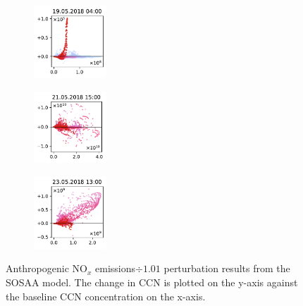\begin{figure}[H]
    \begin{subfigure}
        \centering
        \includegraphics[width=0.30\textwidth,valign=t]{evaluation/figures/perturbations/perturbation-19.05.2018:04.00-nox-div-1.01.pdf}
    \end{subfigure}
    \begin{subfigure}
        \centering
        \includegraphics[width=0.30\textwidth,valign=t]{evaluation/figures/perturbations/perturbation-21.05.2018:15.00-nox-div-1.01.pdf}
    \end{subfigure}
    \begin{subfigure}
        \centering
        \includegraphics[width=0.30\textwidth,valign=t]{evaluation/figures/perturbations/perturbation-23.05.2018:13.00-nox-div-1.01.pdf}
    \end{subfigure}

    \caption[$\text{NO}_x$ emissions$\div 1.01$ perturbation SOSAA results]{Anthropogenic $\text{NO}_x$ emissions$\div 1.01$ perturbation results from the SOSAA model. The change in CCN is plotted on the y-axis against the baseline CCN concentration on the x-axis.}
    \label{fig:sosaa-perturbation-nox-div-1.01}
\end{figure}

